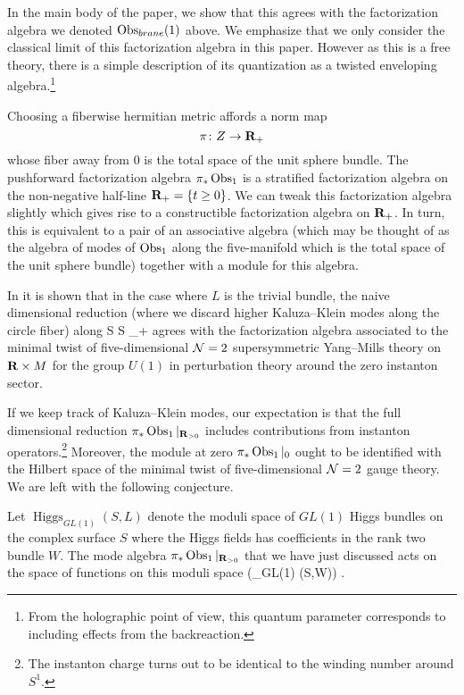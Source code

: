 In the main body of the paper, we show that this agrees with the factorization algebra we denoted $\operatorname{Obs}_{brane}(1)$ above. We emphasize that we only consider the classical limit of this factorization algebra in this paper. However as this is a free theory, there is a simple description of its quantization as a twisted enveloping algebra.\footnote{From the holographic point of view, this quantum parameter corresponds to including effects from the backreaction.}

Choosing a fiberwise hermitian metric affords a norm map 
\[
\pi \colon Z \to \mathbf{R}_{+}
\] 
whose fiber away from $0$ is the total space of the unit sphere bundle.
The pushforward factorization algebra $\pi_{*}\operatorname{Obs}_{1}$ is a stratified factorization algebra on the non-negative half-line $\mathbf{R}_+ = \{t \geq 0\}$. 
We can tweak this factorization algebra slightly which gives rise to a constructible factorization algebra on $\mathbf{R}_+$.
In turn, this is equivalent to a pair of an associative algebra (which may be thought of as the algebra of modes of $\operatorname{Obs}_{1}$ along the five-manifold which is the total space of the unit sphere bundle) together with a module for this algebra.

In \cite{SWtensor} it is shown that in the case where $L$ is the trivial bundle, the naive dimensional reduction (where we discard higher Kaluza--Klein modes along the circle fiber) along 
\beqn
S \times \C \to S \times \R_+
\eeqn
agrees with the factorization algebra associated to the minimal twist of five-dimensional $\mathcal N = 2$ supersymmetric Yang--Mills theory on $\mathbf{R}\times M$ for the group $U(1)$ in perturbation theory around the zero instanton sector.

If we keep track of Kaluza--Klein modes, our expectation is that the full dimensional reduction $\pi_{*}\operatorname{Obs}_{1}|_{\mathbf{R}_{>0}}$ includes contributions from instanton operators.\footnote{The instanton charge turns out to be identical to the winding number around $S^1$.} Moreover, the module at zero $\pi_{*}\operatorname{Obs}_{1}|_{0}$ ought to be identified with the Hilbert space of the minimal twist of five-dimensional $\mathcal N = 2$ gauge theory. We are left with the following conjecture.

\begin{conj}
Let $\operatorname{Higgs}_{GL(1)} (S,L)$ denote the moduli space of $GL(1)$ Higgs bundles on the complex surface $S$ where the Higgs fields has coefficients in the rank two bundle $W$.
The mode algebra $\pi_{*}\operatorname{Obs}_{1}|_{\mathbf{R}_{>0}}$ that we have just discussed acts on the space of functions on this moduli space
\beqn
\cO \left(_{GL(1)} (S,W)\right) .
\eeqn
\end{conj}

